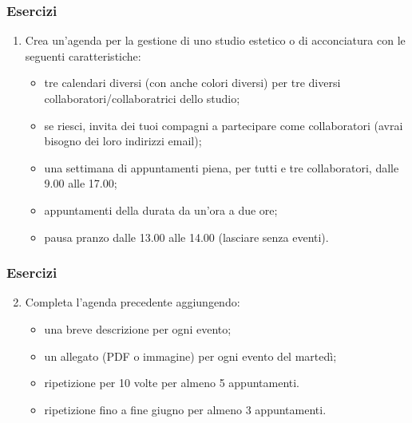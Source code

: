 \documentclass[handout]{beamer}
\begin{document}
\begin{frame}
\frametitle{Esercizi}
\begin{enumerate}
  \item Crea un'agenda per la gestione di uno studio estetico o di acconciatura con le seguenti caratteristiche:
  \begin{itemize}
    \item tre calendari diversi (con anche colori diversi) per tre diversi collaboratori/collaboratrici dello studio;
    \item se riesci, invita dei tuoi compagni a partecipare come collaboratori (avrai bisogno dei loro indirizzi email);
    \item una settimana di appuntamenti piena, per tutti e tre collaboratori, dalle 9.00 alle 17.00;
    \item appuntamenti della durata da un'ora a due ore;
    \item pausa pranzo dalle 13.00 alle 14.00 (lasciare senza eventi).
  \end{itemize}
\end{enumerate}
\end{frame}

\begin{frame}
  \frametitle{Esercizi}
  \begin{enumerate}\setcounter{enumi}{1}
    \item Completa l'agenda precedente aggiungendo:
    \begin{itemize}
      \item una breve descrizione per ogni evento;
      \item un allegato (PDF o immagine) per ogni evento del martedì;
      \item ripetizione per 10 volte per almeno 5 appuntamenti.
      \item ripetizione fino a fine giugno per almeno 3 appuntamenti.
    \end{itemize}
  \end{enumerate}
\end{frame}
\end{document}
